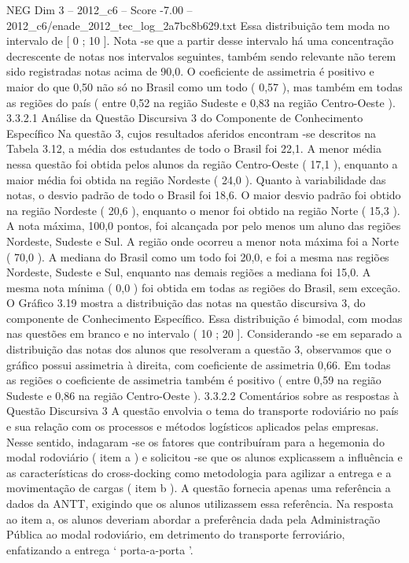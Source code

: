 \begin{textsample}{NEG Dim 3 – 2012\_c6 – Score -7.00 – 2012\_c6/enade\_2012\_tec\_log\_2a7bc8b629.txt}
Essa distribuição tem moda no intervalo de [ 0 ; 10 ].
Nota -se que a partir desse intervalo há uma concentração decrescente de notas nos intervalos seguintes, também sendo relevante não terem sido registradas notas acima de 90,0.
O coeficiente de assimetria é positivo e maior do que 0,50 não só no Brasil como um todo ( 0,57 ), mas também em todas as regiões do país ( entre 0,52 na região Sudeste e 0,83 na região Centro-Oeste ). 3.3.2.1 Análise da Questão Discursiva 3 do Componente de Conhecimento Específico Na questão 3, cujos resultados aferidos encontram -se descritos na Tabela 3.12, a média dos estudantes de todo o Brasil foi 22,1.
A menor média nessa questão foi obtida pelos alunos da região Centro-Oeste ( 17,1 ), enquanto a maior média foi obtida na região Nordeste ( 24,0 ).
Quanto à variabilidade das notas, o desvio padrão de todo o Brasil foi 18,6.
O maior desvio padrão foi obtido na região Nordeste ( 20,6 ), enquanto o menor foi obtido na região Norte ( 15,3 ).
A nota máxima, 100,0 pontos, foi alcançada por pelo menos um aluno das regiões Nordeste, Sudeste e Sul.
A região onde ocorreu a menor nota máxima foi a Norte ( 70,0 ).
A mediana do Brasil como um todo foi 20,0, e foi a mesma nas regiões Nordeste, Sudeste e Sul, enquanto nas demais regiões a mediana foi 15,0.
A mesma nota mínima ( 0,0 ) foi obtida em todas as regiões do Brasil, sem exceção.
O Gráfico 3.19 mostra a distribuição das notas na questão discursiva 3, do componente de Conhecimento Específico.
Essa distribuição é bimodal, com modas nas questões em branco e no intervalo ( 10 ; 20 ].
Considerando -se em separado a distribuição das notas dos alunos que resolveram a questão 3, observamos que o gráfico possui assimetria à direita, com coeficiente de assimetria 0,66.
Em todas as regiões o coeficiente de assimetria também é positivo ( entre 0,59 na região Sudeste e 0,86 na região Centro-Oeste ). 3.3.2.2 Comentários sobre as respostas à Questão Discursiva 3 A questão envolvia o tema do transporte rodoviário no país e sua relação com os processos e métodos logísticos aplicados pelas empresas.
Nesse sentido, indagaram -se os fatores que contribuíram para a hegemonia do modal rodoviário ( item a ) e solicitou -se que os alunos explicassem a influência e as características do cross-docking como metodologia para agilizar a entrega e a movimentação de cargas ( item b ).
A questão fornecia apenas uma referência a dados da ANTT, exigindo que os alunos utilizassem essa referência.
Na resposta ao item a, os alunos deveriam abordar a preferência dada pela Administração Pública ao modal rodoviário, em detrimento do transporte ferroviário, enfatizando a entrega ‘ porta-a-porta ’.

\end{textsample}
